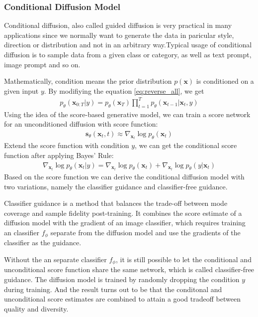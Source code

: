\documentclass[12pt,DIV14,BCOR12mm,a4paper,footinclude=false,headinclude,parskip=half-,twoside,openright,cleardoublepage=empty,toc=index,bibliography=totoc,listof=totoc]{scrreprt}
\numberwithin{equation}{chapter}
\begin{document}
\subsubsection{Conditional Diffusion Model}\label{sec:cond}
Conditional diffusion, also called guided diffusion is very practical in many applications since we normally want to generate the data in paricular style, direction or distribution and not in an arbitrary way.Typical usage of conditional diffusion is to sample data from a given class or category, as well as text prompt, image prompt and so on.

Mathematically, condition means the prior distribution $p(\mathbf{x})$ is conditioned on a given input $y$. By modifiying the equation \ref{eq:reverse_all}, we get
\begin{align}
  p_{\theta}(\mathbf{x}_{0:T}|y) = p_{\theta}(\mathbf{x}_{T})\prod_{t=1}^{T}p_{\theta}(\mathbf{x}_{t-1}|\mathbf{x}_{t},y)
\end{align}
Using the idea of the score-based generative model\cite{song2020generative}, we can train a score network for an unconditioned diffusion with score function:
\begin{align}
  \mathbf{s}_{\theta}(\mathbf{x}_{t}, t)\approx \nabla _{\mathbf{x}_{t}}\log p_{\theta}(\mathbf{x}_{t})
\end{align}
Extend the score function with condition $y$, we can get the conditional score function after applying Bayes' Rule:
\begin{align}
  \nabla _{\mathbf{x}_{t}}\log p_{\theta}(\mathbf{x}_{t}|y)=\nabla _{\mathbf{x}_{t}}\log p_{\theta}(\mathbf{x}_{t}) + \nabla _{\mathbf{x}_{t}}\log p_{\theta}(y|\mathbf{x}_{t})
\end{align}
Based on the score function we can derive the conditional diffusion model with two variations, namely the classifier guidance and classifier-free guidance.

Classifier guidance is a method that balances the trade-off between mode coverage and sample fidelity post-training. It combines the score estimate of a diffusion model with the gradient of an image classifier, which requires training an classifier $f_{\phi}$ separate from the diffusion model and use the gradients of the classifier as the guidance.

Without the an separate classifier $f_{\phi}$, it is still possible to let the conditional and unconditional score function share the same network, which is called classifier-free guidance. The diffusion model is trained by randomly dropping the condition $y$ during training. And the result turns out to be that the conditonal and unconditional score estimates are combined to attain a good tradeoff between quality and diversity\cite{ho2022classifierfree}.
\end{document}
